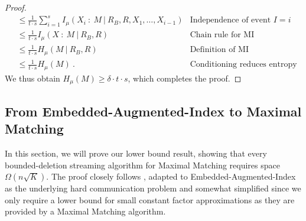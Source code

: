\documentclass[11pt,a4paper]{article}
\begin{document}
\begin{proof}
\begin{align*}
  & \le \frac{1}{t \cdot s}  \sum_{i=1}^s I_{\mu}(X_i \ : \  M \ | \ R_B, R, X_1, \dots, X_{i-1}) & \mbox{Independence of event $I=i$} \\
  & \le \frac{1}{t \cdot s} I_{\mu}(X \ : \  M \ | \ R_B, R) & \mbox{Chain rule for MI} \\ 
  & \le \frac{1}{t\cdot s} H_{\mu}(M \ | \ R_B, R)  & \mbox{Definition of MI} \\
  & \le \frac{1}{t \cdot s} H_{\mu}(M) \ . & \mbox{Conditioning reduces entropy}
\end{align*}
We thus obtain $H_{\mu}(M) \ge \delta \cdot t \cdot s$, which completes the proof.
\end{proof}


\subsection{From \textsf{Embedded-Augmented-Index} to \textsf{Maximal Matching}} \label{sec:reduction}

In this section, we will prove our lower bound result, showing that every bounded-deletion streaming algorithm for \textsf{Maximal Matching} requires space $\Omega(n \sqrt{K})$. The proof closely follows \cite{dk20}, adapted to \textsf{Embedded-Augmented-Index} as the underlying hard communication problem and somewhat simplified since we only require a lower bound for small constant factor approximations as they are provided by a \textsf{Maximal Matching} algorithm. 


\setcounter{thmsaved}{\value{theorem}}
\setcounter{theorem}{\value{counterLB}}
\addtocounter{theorem}{-1}
\end{document}
